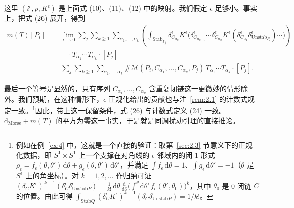 这里 $(i^\epsilon,p,K^\epsilon)$ 是上面式 (10)、(11)、(12) 中的映射。我们假定 $\epsilon$ 足够小。事实上，把式 (26) 展开，得到
\begin{equation}\tag{27}\label{eq:27}
\begin{aligned}
  m(T)[P_i]={}&
  \lim_{\epsilon\to0}\sum_{j}\sum_{k\ge1}\sum_{\alpha_1,\dots,\alpha_k}
  \left(\int_{\mathrm{Stab}_{P_j}}\delta^\epsilon_{C_{\alpha_k}}
  K^\epsilon\bigl(\delta^\epsilon_{C_{\alpha_{k-1}}}\cdots
  \delta^\epsilon_{C_{\alpha_2}}K^\epsilon
  (\delta^\epsilon_{C_{\alpha_1}}\delta^\epsilon_{\mathrm{Unstab}_{P_i}})\cdots\bigr)
  \right)\\
  &\quad\cdot T_{\alpha_1}\cdots T_{\alpha_k}\cdot[P_j]\\
  ={}&\sum_{j}\sum_{k\ge1}\sum_{\alpha_1,\dots,\alpha_k}
  \#\mathcal M(P_i,C_{\alpha_1},\dots,C_{\alpha_k},P_j)\,
  T_{\alpha_1}\cdots T_{\alpha_k}\cdot[P_j].
\end{aligned}
\end{equation}

最后一个等号是显然的，只有序列 $C_{\alpha_1},\dots,C_{\alpha_k}$ 含重复闭链这一更微妙的情形除外。我们预期，在这种情形下，$\epsilon$-正规化给出的贡献也与注~\ref{rem:2.1} 的计数式规定一致。\footnote{例如在例~\ref{ex:4} 中，这就是一个直接的验证：取第~\ref{sec:2.3} 节意义下的正规化数据，即 $S^1\times S^1$ 上一个支撑在对角线的 $\epsilon$-邻域内的闭 1-形式 $\rho_\epsilon=f_\epsilon(\theta,\theta')\,\mathrm{d}\theta+g_\epsilon(\theta,\theta')\,\mathrm{d}\theta'$，并满足 $\int f_\epsilon\,\mathrm{d}\theta=1$、$\int g_\epsilon\,\mathrm{d}\theta'=-1$（$\theta$ 是 $S^1$ 上的角坐标）。对 $k=1,2,\dots$ 作归纳可证 $(\delta^\epsilon_C K^\epsilon)^{k-1}(\delta^\epsilon_C\delta^\epsilon_{\mathrm{Unstab}P})=\frac{1}{k!}\,\mathrm{d}\theta\,\frac{\mathrm{d}}{\mathrm{d}\theta}\bigl(\int^\theta \mathrm{d}\theta'\,f_\epsilon(\theta',\theta_0)\bigr)^k$，其中 $\theta_0$ 是 0-闭链 $C$ 的位置。由此可得 $\int_{\mathrm{Stab}Q}(\delta^\epsilon_C K^\epsilon)^{k-1}(\delta^\epsilon_C\delta^\epsilon_{\mathrm{Unstab}P})=1/k!$。}因此，带上这一保留条件，式 (26) 与计数式定义 (24) 一致。$\mathrm{d}_{\mathrm{Morse}}+m(T)$ 的平方为零这一事实，于是就是同调扰动引理的直接推论。


